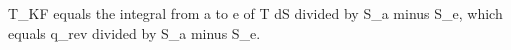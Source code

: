 T_KF equals the integral from a to e of T dS divided by S_a minus S_e, which equals q_rev divided by S_a minus S_e.